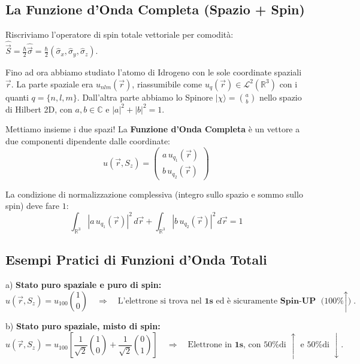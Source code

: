 \documentclass[11pt, a4paper]{article}
\begin{document}
\subsection{La Funzione d'Onda Completa (Spazio + Spin)} %

Riscriviamo l'operatore di spin totale vettoriale per comodità: $\hat{\vec{S}} = \frac{\hbar}{2}\hat{\vec{\sigma}} = \frac{\hbar}{2}(\hat{\sigma}_x, \hat{\sigma}_y, \hat{\sigma}_z)$. %

\noindent
Fino ad ora abbiamo studiato l'atomo di Idrogeno con le sole coordinate spaziali $\vec{r}$. La parte spaziale era $u_{nlm}(\vec{r})$, riassumibile come $u_q(\vec{r}) \in \mathcal{L}^2(\mathbb{R}^3)$ con i quanti $q = \{n, l, m\}$. %
Dall'altra parte abbiamo lo Spinore $|\chi\rangle = \binom{a}{b}$ nello spazio di Hilbert 2D, con $a, b \in \mathbb{C}$ e $|a|^2+|b|^2 = 1$. %

\noindent
Mettiamo insieme i due spazi! La \textbf{Funzione d'Onda Completa} è un vettore a due componenti dipendente dalle coordinate: %
\begin{equation}
    \boxed{ u(\vec{r}, S_z) = \begin{pmatrix} a \, u_{q_1}(\vec{r}) \\ b \, u_{q_2}(\vec{r}) \end{pmatrix} } %
\end{equation}

\noindent
La condizione di normalizzazione complessiva (integro sullo spazio e sommo sullo spin) deve fare $1$: %
\begin{equation*}
    \int_{\mathbb{R}^3} |a \, u_{q_1}(\vec{r})|^2 \, d\vec{r} + \int_{\mathbb{R}^3} |b \, u_{q_2}(\vec{r})|^2 \, d\vec{r} = 1 %
\end{equation*}

\subsection{Esempi Pratici di Funzioni d'Onda Totali} %

a) \textbf{Stato puro spaziale e puro di spin:} %
\begin{equation*}
    u(\vec{r}, S_z) = u_{100} \binom{1}{0} \quad \Rightarrow \quad \text{L'elettrone si trova nel } \textbf{1s} \text{ ed è sicuramente } \textbf{Spin-UP} \text{ (100\% $\uparrow$)}. %
\end{equation*}

b) \textbf{Stato puro spaziale, misto di spin:} %
\begin{equation*}
    u(\vec{r}, S_z) = u_{100} \left[ \frac{1}{\sqrt{2}} \binom{1}{0} + \frac{1}{\sqrt{2}} \binom{0}{1} \right] \quad \Rightarrow \quad \text{Elettrone in } \textbf{1s} \text{, con 50\% di } \uparrow \text{ e 50\% di } \downarrow. %
\end{equation*}
\end{document}
